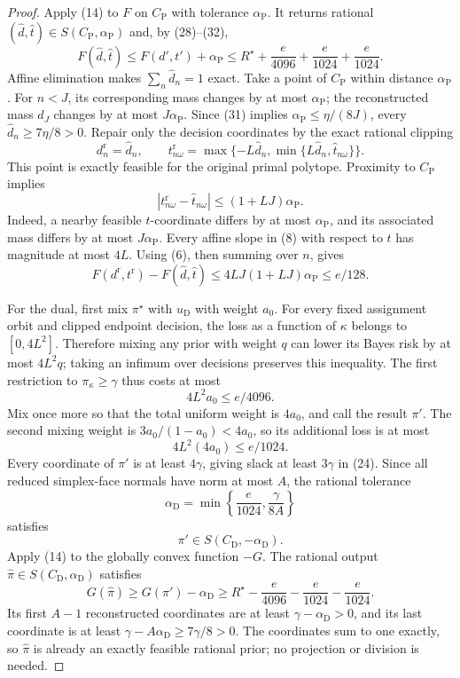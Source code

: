 \documentclass{article}
\begin{document}
\begin{proof}
Apply (14) to \(F\) on \(C_{\mathrm P}\) with tolerance \(\alpha_{\mathrm P}\).  It returns rational \((\widehat d,\widehat t)\in S(C_{\mathrm P},\alpha_{\mathrm P})\) and, by (28)--(32),
\[
 F(\widehat d,\widehat t)
 \le F(d',t')+\alpha_{\mathrm P}
 \le R^\star+\frac e{4096}+\frac e{1024}+\frac e{1024}.
\tag{33}
\]
Affine elimination makes \(\sum_n\widehat d_n=1\) exact.  Take a point of \(C_{\mathrm P}\) within distance \(\alpha_{\mathrm P}\).  For \(n<J\), its corresponding mass changes by at most \(\alpha_{\mathrm P}\); the reconstructed mass \(d_J\) changes by at most \(J\alpha_{\mathrm P}\).  Since (31) implies \(\alpha_{\mathrm P}\le\eta/(8J)\), every \(\widehat d_n\ge7\eta/8>0\).  Repair only the decision coordinates by the exact rational clipping
\[
 d_n^{\mathrm r}=\widehat d_n,
 \qquad
 t_{n\omega}^{\mathrm r}
 =\max\{-L\widehat d_n,
          \min\{L\widehat d_n,\widehat t_{n\omega}\}\}.
\tag{34}
\]
This point is exactly feasible for the original primal polytope.  Proximity to \(C_{\mathrm P}\) implies
\[
 |t_{n\omega}^{\mathrm r}-\widehat t_{n\omega}|
 \le(1+LJ)\alpha_{\mathrm P}.
\tag{35}
\]
Indeed, a nearby feasible \(t\)-coordinate differs by at most \(\alpha_{\mathrm P}\), and its associated mass differs by at most \(J\alpha_{\mathrm P}\).  Every affine slope in (8) with respect to \(t\) has magnitude at most \(4L\).  Using (6), then summing over \(n\), gives
\[
 F(d^{\mathrm r},t^{\mathrm r})-F(\widehat d,\widehat t)
 \le4LJ(1+LJ)\alpha_{\mathrm P}
 \le e/128.
\tag{36}
\]

For the dual, first mix \(\pi^\star\) with \(u_{\mathrm D}\) with weight \(a_0\).  For every fixed assignment orbit and clipped endpoint decision, the loss as a function of \(\kappa\) belongs to \([0,4L^2]\).  Therefore mixing any prior with weight \(q\) can lower its Bayes risk by at most \(4L^2q\); taking an infimum over decisions preserves this inequality.  The first restriction to \(\pi_\kappa\ge\gamma\) thus costs at most
\[
 4L^2a_0\le e/4096.
\tag{37}
\]
Mix once more so that the total uniform weight is \(4a_0\), and call the result \(\pi'\).  The second mixing weight is \(3a_0/(1-a_0)<4a_0\), so its additional loss is at most
\[
 4L^2(4a_0)\le e/1024.
\tag{38}
\]
Every coordinate of \(\pi'\) is at least \(4\gamma\), giving slack at least \(3\gamma\) in (24).  Since all reduced simplex-face normals have norm at most \(A\), the rational tolerance
\[
 \alpha_{\mathrm D}=\min\left\{\frac e{1024},\frac{\gamma}{8A}\right\}
\tag{39}
\]
satisfies
\[
 \pi'\in S(C_{\mathrm D},-\alpha_{\mathrm D}).
\tag{40}
\]
Apply (14) to the globally convex function \(-G\).  The rational output \(\widehat\pi\in S(C_{\mathrm D},\alpha_{\mathrm D})\) satisfies
\[
 G(\widehat\pi)
 \ge G(\pi')-\alpha_{\mathrm D}
 \ge R^\star-\frac e{4096}-\frac e{1024}-\frac e{1024}.
\tag{41}
\]
Its first \(A-1\) reconstructed coordinates are at least \(\gamma-\alpha_{\mathrm D}>0\), and its last coordinate is at least \(\gamma-A\alpha_{\mathrm D}\ge7\gamma/8>0\).  The coordinates sum to one exactly, so \(\widehat\pi\) is already an exactly feasible rational prior; no projection or division is needed.


\end{proof}
\end{document}
